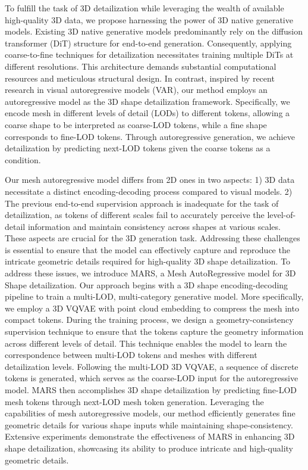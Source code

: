 To fulfill the task of 3D detailization while leveraging the wealth of available high-quality 3D data, we propose harnessing the power of 3D native generative models. Existing 3D native generative models predominantly rely on the diffusion transformer (DiT) structure for end-to-end generation. Consequently, applying coarse-to-fine techniques for detailization necessitates training multiple DiTs at different resolutions. This architecture demands substantial computational resources and meticulous structural design. In contrast, inspired by recent research in visual autoregressive models (VAR), our method employs an autoregressive model as the 3D shape detailization framework. Specifically, we encode mesh in different levels of detail (LODs) to different tokens, allowing a coarse shape to be interpreted as coarse-LOD tokens, while a fine shape corresponds to fine-LOD tokens. Through autoregressive generation, we achieve detailization by predicting next-LOD tokens given the coarse tokens as a condition.

Our mesh autoregressive model differs from 2D ones in two aspects: 1) 3D data necessitate a distinct encoding-decoding process compared to visual models. 2) The previous end-to-end supervision approach is inadequate for the task of detailization, as tokens of different scales fail to accurately perceive the level-of-detail information and maintain consistency across shapes at various scales. These aspects are crucial for the 3D generation task. Addressing these challenges is essential to ensure that the model can effectively capture and reproduce the intricate geometric details required for high-quality 3D shape detailization.
To address these issues, we introduce MARS, a Mesh AutoRegressive model for 3D Shape detailization. Our approach begins with a 3D shape encoding-decoding pipeline to train a multi-LOD, multi-category generative model. More specifically, we employ a 3D VQVAE with point cloud embedding to compress the mesh into compact tokens. During the training process, we design a geometry-consistency supervision technique to ensure that the tokens capture the geometry information across different levels of detail. This technique enables the model to learn the correspondence between multi-LOD tokens and meshes with different detailization levels. Following the multi-LOD 3D VQVAE, a sequence of discrete tokens is generated, which serves as the coarse-LOD input for the autoregressive model. MARS then accomplishes 3D shape detailization by predicting fine-LOD mesh tokens through next-LOD mesh token generation. Leveraging the capabilities of mesh autoregressive models, our method efficiently generates fine geometric details for various shape inputs while maintaining shape-consistency. Extensive experiments demonstrate the effectiveness of MARS in enhancing 3D shape detailization, showcasing its ability to produce intricate and high-quality geometric details.

